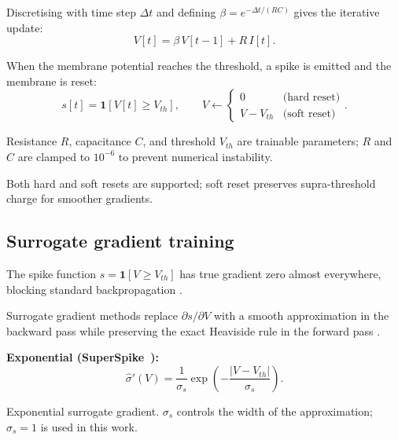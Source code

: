 \documentclass[conference]{IEEEtran}
\begin{document}
\par Discretising with time step $\Delta t$ and defining
$\beta = e^{-\Delta t/(RC)}$ gives the iterative update:
\begin{equation}
  V[t] = \beta\, V[t-1] + R\,I[t].
  \label{eq:lif}
\end{equation}

\par When the membrane potential reaches the threshold, a spike is emitted and
the membrane is reset:
\begin{equation}
  s[t] = \mathbf{1}[V[t] \geq V_{th}], \qquad
  V \leftarrow
    \begin{cases} 0 & \text{(hard reset)} \\ V - V_{th} & \text{(soft reset)} \end{cases}.
\end{equation}

\par Resistance $R$, capacitance $C$, and threshold $V_{th}$ are trainable
parameters; $R$ and $C$ are clamped to $10^{-6}$ to prevent numerical
instability.

\par Both hard and soft resets are supported; soft reset preserves supra-threshold
charge for smoother gradients.

\subsection{Surrogate gradient training}
\label{sec:surr}

\par The spike function $s = \mathbf{1}[V \geq V_{th}]$ has true gradient zero almost everywhere, blocking standard backpropagation \cite{neftci2019surrogate}.

\par Surrogate gradient methods replace $\partial s / \partial V$ with a smooth approximation in the backward pass while preserving the exact Heaviside rule in the forward pass \cite{neftci2019surrogate,zenke2021remarkable}.

\textbf{Exponential (SuperSpike~\cite{zenke2018superspike}):}
\begin{equation}
  \hat{\sigma}'(V) = \frac{1}{\sigma_s}
    \exp\!\left(-\frac{|V - V_{th}|}{\sigma_s}\right).
\end{equation}
\par Exponential surrogate gradient.  $\sigma_s$ controls the width of the approximation; $\sigma_s=1$ is used in this work.
\end{document}
